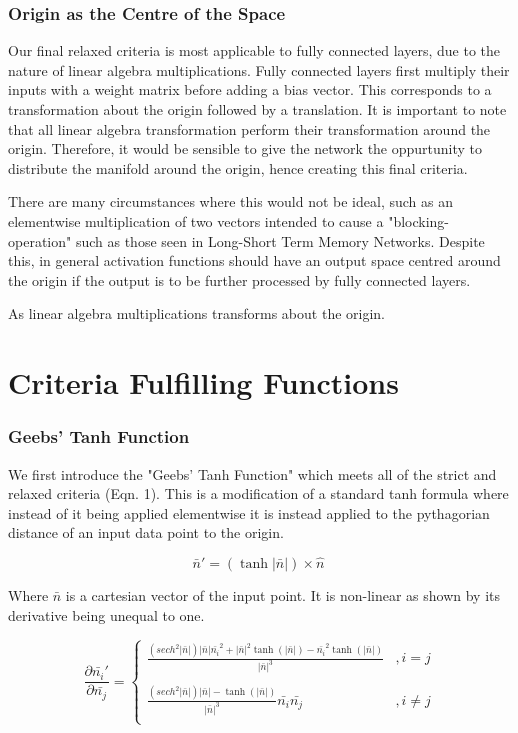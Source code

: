 \documentclass[onecolumn]{article}
\begin{document}
    \subsubsection{Origin as the Centre of the Space}
        
    Our final relaxed criteria is most applicable to fully connected layers, due to the nature of linear algebra multiplications. Fully connected layers first multiply their inputs with a weight matrix before adding a bias vector. This corresponds to a transformation about the origin followed by a translation. It is important to note that all linear algebra transformation perform their transformation around the origin. Therefore, it would be sensible to give the network the oppurtunity to distribute the manifold around the origin, hence creating this final criteria.
    
    There are many circumstances where this would not be ideal, such as an elementwise multiplication of two vectors intended to cause a "blocking-operation" such as those seen in Long-Short Term Memory Networks. Despite this, in general activation functions should have an output space centred around the origin if the output is to be further processed by fully connected layers.
    
    As linear algebra multiplications transforms about the origin.
       
    \section{Criteria Fulfilling Functions}
    \subsubsection{Geebs' Tanh Function}
    We first introduce the "Geebs' Tanh Function" which meets all of the strict and relaxed criteria (Eqn. 1). This is a modification of a standard tanh formula where instead of it being applied elementwise it is instead applied to the pythagorian distance of an input data point to the origin.

    \begin{equation}
        \label{eqn:Geebs' Tanh Function}
        \bar{n}'=\left(\tanh|\bar{n}|\right)\times\hat{n}\
    \end{equation}

    Where $\bar{n}$ is a cartesian vector of the input point. It is non-linear as shown by its derivative being unequal to one.

    \[\frac{\partial \bar{n_{i}}'}{\partial \bar{n_{j}}}=\left\{
    \begin{array}{ll}
        \frac{\left(sech^{2}|\bar{n}|\right)|\bar{n}|\bar{n_{i}}^{2}+|\bar{n}|^{2}\tanh\left( |\bar{n}|\right)-\bar{n_{i}}^{2}\tanh\left( |\bar{n}|\right)}{ |\bar{n}|^{3}} & ,i = j \\
        \\
        \frac{\left(sech^{2}|\bar{n}|\right)|\bar{n}|-\tanh\left(|\bar{n}|\right)}{ |\bar{n}|^{3}}\bar{n_{i}}\bar{n_{j}} & ,i \neq j \\
    \end{array} 
    \right. \]
\end{document}
